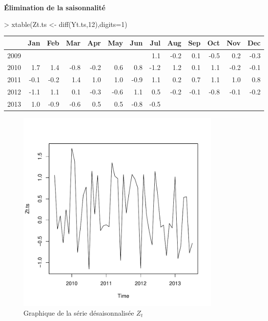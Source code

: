 \documentclass{article}
\begin{document}
\textbf{Élimination de la saisonnalité}
\begin{Schunk}
\begin{Sinput}
> xtable(Zt.ts <- diff(Yt.ts,12),digits=1)
\end{Sinput}
\begin{table}[ht]
\centering
\begin{tabular}{rrrrrrrrrrrrr}
  \hline
 & Jan & Feb & Mar & Apr & May & Jun & Jul & Aug & Sep & Oct & Nov & Dec \\ 
  \hline
2009 &  &  &  &  &  &  & 1.1 & -0.2 & 0.1 & -0.5 & 0.2 & -0.3 \\ 
  2010 & 1.7 & 1.4 & -0.8 & -0.2 & 0.6 & 0.8 & -1.2 & 1.2 & 0.1 & 1.1 & -0.2 & -0.1 \\ 
  2011 & -0.1 & -0.2 & 1.4 & 1.0 & 1.0 & -0.9 & 1.1 & 0.2 & 0.7 & 1.1 & 1.0 & 0.8 \\ 
  2012 & -1.1 & 1.1 & 0.1 & -0.3 & -0.6 & 1.1 & 0.5 & -0.2 & -0.1 & -0.8 & -0.1 & -0.2 \\ 
  2013 & 1.0 & -0.9 & -0.6 & 0.5 & 0.5 & -0.8 & -0.5 &  &  &  &  &  \\ 
   \hline
\end{tabular}
\end{table}\end{Schunk}

\begin{figure}[p]
  \centering
  \includegraphics[height=4in, width=4in]{exercice1-graph2.pdf}
  \caption{Graphique de la série désaisonnalisée $Z_t$}
  \label{fig:exercice1-graph2}
\end{figure}
\end{document}
